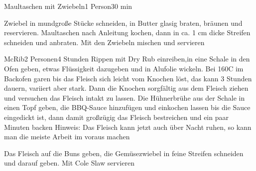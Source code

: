 
\begin{recipe}{Maultaschen mit Zwiebeln}{1 Person}{30 min}

Zwiebel in mundgroße Stücke schneiden, in Butter glasig braten, bräunen und reservieren. Maultaschen nach Anleitung kochen, dann in ca. 1 cm dicke Streifen schneiden und anbraten. Mit den Zwiebeln mischen und servieren
\end{recipe}


\begin{recipe}{McRib}{2 Personen}{4 Stunden}
Rippen mit Dry Rub einreiben,in eine Schale in den Ofen geben, etwas Flüssigkeit dazugeben und in Alufolie wickeln. Bei 160\0C im Backofen garen bis das Fleisch sich leicht vom Knochen löst, das kann 3 Stunden dauern, variiert aber stark. Dann die Knochen sorgfältig aus dem Fleisch ziehen und versuchen das Fleisch intakt zu lassen. Die Hühnerbrühe aus der Schale in einen Topf geben, die BBQ-Sauce hinzufügen und einkochen lassen bis die Sauce eingedickt ist, dann damit großzügig das Fleisch bestreichen und ein paar Minuten backen
\newline
Hinweis: Das Fleisch kann jetzt auch über Nacht ruhen, so kann man die meiste Arbeit im voraus machen

Das Fleisch auf die Buns geben, die Gemüsezwiebel in feine Streifen schneiden und darauf geben. Mit Cole Slaw servieren 

\end{recipe}


